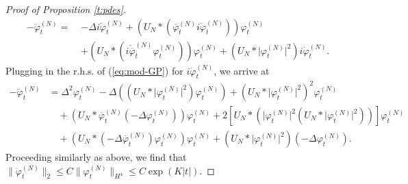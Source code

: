\documentclass[11pt,a4paper]{article}
\newcommand{\ph}{\varphi_t^{(N)}}	%
\newcommand{\phdot}{\dot{\varphi}_t^{(N)}}	%
\newcommand{\phddot}{\ddot{\varphi}_t^{(N)}}	%
\begin{document}
\begin{proof}[Proof of Proposition \ref{t:pdes}]
\[ \begin{split}
-\phddot  = \; &-\Delta i \phdot + \left( U_N \ast (\overline{\varphi}_t^{(N)} i \phdot)\right) \ph \\
&+ \left( U_N \ast (i\dot{\overline{\varphi}}_t^{(N)} \ph) \right) \ph + \left( U_N \ast \lvert\ph\rvert^2 \right) i \phdot.
\end{split}\]
Plugging in the r.h.s. of (\ref{eq:mod-GP}) for $i\phdot$, we arrive at 
\begin{align*}
- \phddot & = \Delta^2 \ph - \Delta \left( (U_N \ast \lvert \ph\rvert^2)\ph \right) + \left( U_N \ast \lvert \ph\rvert^2 \right)^2 \ph \\
& \quad + (U_N \ast \overline{\varphi}_t^{(N)} (-\Delta \ph))\ph + 2 \left[ U_N \ast \left( \lvert \ph\rvert^2 (U_N \ast \lvert \ph\rvert^2) \right) \right] \ph \\
& \quad + (U_N \ast (-\Delta \overline{\varphi}_t^{(N)}) \ph ) \ph + \left( U_N \ast \lvert \ph \rvert^2 \right)(-\Delta \ph).
\end{align*}
Proceeding similarly as above, we find that $\| \ddot \varphi_t^{(N)} \|_{2} \leq C \| \varphi_t^{(N)} \|_{H^4} \leq C \exp (K |t|)$. 


\end{proof}
\end{document}
